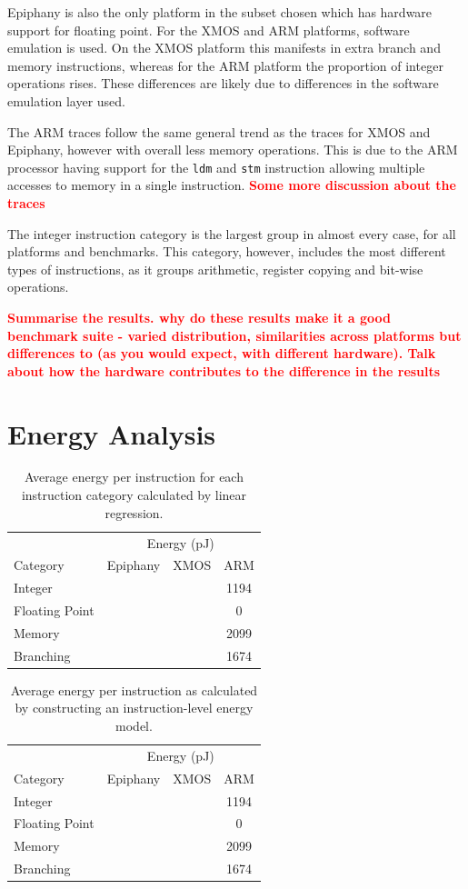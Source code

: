 \documentclass[twocolumn]{article}
\newcommand{\todo}[1]{\textbf{\textcolor{red}{#1}}}
\begin{document}
Epiphany is also the only platform in the subset chosen which has hardware support for floating point. For the XMOS and ARM platforms, software emulation is used. On the XMOS platform this manifests in extra branch and memory instructions, whereas for the ARM platform the proportion of integer operations rises. These differences are likely due to differences in the software emulation layer used.

The ARM traces follow the same general trend as the traces for XMOS and Epiphany, however with overall less memory operations. This is due to the ARM processor having support for the \texttt{ldm} and \texttt{stm} instruction allowing multiple accesses to memory in a single instruction.
\todo{Some more discussion about the traces}

The integer instruction category is the largest group in almost every case, for all platforms and benchmarks. This category, however, includes the most different types of instructions, as it groups arithmetic, register copying and bit-wise operations.

\todo{Summarise the results. why do these results make it a good benchmark suite - varied distribution, similarities across platforms but differences to (as you would expect, with different hardware). Talk about how the hardware contributes to the difference in the results}

\section{Energy Analysis}

\begin{table}
	\centering
	\begin{tabular}{l c c c}
						& \multicolumn{3}{c}{Energy (pJ)}\\
		Category 		& Epiphany 	& XMOS 	& ARM  	\\
		\hline
		Integer 		&			&		& 1194 	\\
		Floating Point 	&			&		& 0		\\
		Memory			&			&		& 2099	\\
		Branching		&			&		& 1674	\\
	\end{tabular}
	\caption{Average energy per instruction for each instruction category calculated by linear regression.}
	\label{Table:RegressionResults}
\end{table}

\begin{table}
	\centering
	\begin{tabular}{l c c c}
						& \multicolumn{3}{c}{Energy (pJ)}\\
		Category 		& Epiphany 	& XMOS 	& ARM  	\\
		\hline
		Integer 		&			&		& 1194 	\\
		Floating Point 	&			&		& 0		\\
		Memory			&			&		& 2099	\\
		Branching		&			&		& 1674	\\
	\end{tabular}
	\caption{Average energy per instruction as calculated by constructing an instruction-level energy model.}
	\label{Table:RegressionResults}
\end{table}
\end{document}
